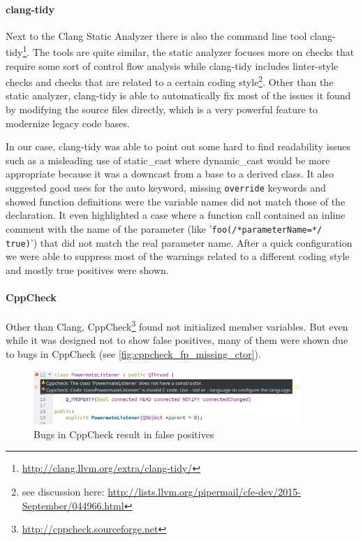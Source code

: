 \documentclass{scrreprt}
\begin{document}
\paragraph{clang-tidy} Next to the Clang Static Analyzer there is also the command line tool clang-tidy\footnote{\url{http://clang.llvm.org/extra/clang-tidy/}}. The tools are quite similar, the static analyzer focuses more on checks that require some sort of control flow analysis while clang-tidy includes linter-style checks and checks that are related to a certain coding style\footnote{see discussion here: \url{http://lists.llvm.org/pipermail/cfe-dev/2015-September/044966.html}}. Other than the static analyzer, clang-tidy is able to automatically fix most of the issues it found by modifying the source files directly, which is a very powerful feature to modernize legacy code bases.

In our case, clang-tidy was able to point out some hard to find readability issues such as a misleading use of static\_cast where dynamic\_cast would be more appropriate because it was a downcast from a base to a derived class. It also suggested good uses for the auto keyword, missing \texttt{override} keywords and showed function definitions were the variable names did not match those of the declaration. It even highlighted a case where a function call contained an inline comment with the name of the parameter (like '\texttt{foo(/*parameterName=*/ true)}') that did not match the real parameter name. After a quick configuration we were able to suppress most of the warnings related to a different coding style and mostly true positives were shown.

\paragraph{CppCheck} Other than Clang, CppCheck\footnote{\url{http://cppcheck.sourceforge.net}} found not initialized member variables. But even while it was designed not to show false positives, many of them were shown due to bugs in CppCheck (see \vref{fig:cppcheck_fp_missing_ctor}).

\begin{figure}[h]
	\centering
	\includegraphics[width=0.9\textwidth]{img/cppcheck_fp_missing_ctor}
	\caption[Bugs in CppCheck]{Bugs in CppCheck result in false positives}
	\label{fig:cppcheck_fp_missing_ctor}
\end{figure}
\end{document}

